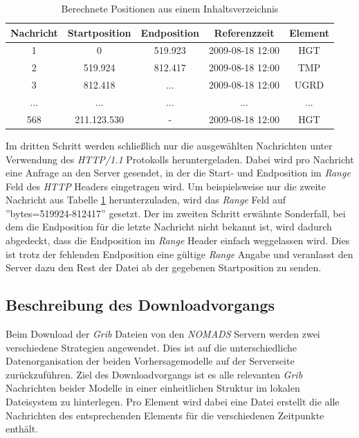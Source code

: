 \begin{table}[h]
  \centering
  {\sf
    \footnotesize
    \begin{longtable}{@{}ccccc}
      \toprule
      \textbf{Nachricht} & \textbf{Startposition} & \textbf{Endposition} & \textbf{Referenzzeit} & \textbf{Element} \\
      \midrule
      1 & 0 & 519.923 & 2009-08-18 12:00 & HGT \\
      2 & 519.924 & 812.417 & 2009-08-18 12:00 & TMP \\
      3 & 812.418 & ... & 2009-08-18 12:00 & UGRD \\
      ... & ... & ... & ... & ... \\
      568 & 211.123.530 & - & 2009-08-18 12:00 & HGT \\
      \bottomrule
    \end{longtable}
  }

  \caption{Berechnete Positionen aus einem Inhaltsverzeichnis}
  \label{tab:inhaltsverzeichnis_mit_positionen}

\end{table}

Im dritten Schritt werden schließlich nur die ausgewählten Nachrichten
unter Verwendung des \textit{HTTP/1.1} Protokolls
heruntergeladen. Dabei wird pro Nachricht eine Anfrage an den Server
gesendet, in der die Start- und Endposition im \textit{Range} Feld des
\textit{HTTP} Headers eingetragen wird. Um beispielsweise nur die
zweite Nachricht aus Tabelle
\ref{tab:inhaltsverzeichnis_mit_positionen} herunterzuladen, wird das
\textit{Range} Feld auf ''bytes=519924-812417'' gesetzt. Der im
zweiten Schritt erwähnte Sonderfall, bei dem die Endposition für die
letzte Nachricht nicht bekannt ist, wird dadurch abgedeckt, dass die
Endposition im \textit{Range} Header einfach weggelassen wird. Dies
ist trotz der fehlenden Endposition eine gültige \textit{Range} Angabe
und veranlasst den Server dazu den Rest der Datei ab der gegebenen
Startposition zu senden.

\subsection{Beschreibung des Downloadvorgangs}

Beim Download der \textit{Grib} Dateien von den \textit{NOMADS}
Servern werden zwei verschiedene Strategien angewendet. Dies ist auf
die unterschiedliche Datenorganisation der beiden Vorhersagemodelle
auf der Serverseite zurückzuführen. Ziel des Downloadvorgangs ist es
alle relevanten \textit{Grib} Nachrichten beider Modelle in einer
einheitlichen Struktur im lokalen Dateisystem zu hinterlegen. Pro
Element wird dabei eine Datei erstellt die alle Nachrichten des
entsprechenden Elements für die verschiedenen Zeitpunkte enthält.

